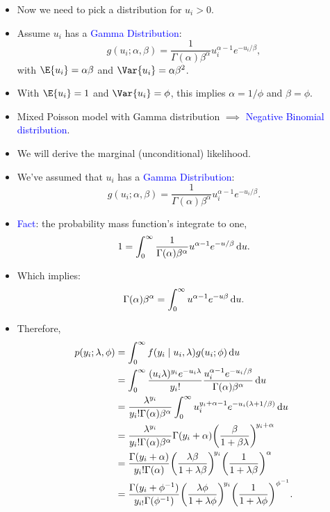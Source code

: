 \documentclass[oneside]{book}\usepackage[]{graphicx}\usepackage[svgnames]{xcolor}
\begin{document}
\begin{itemize}
    \item Now we need to pick a distribution for $ u_i>0 $.
    \item Assume $ u_i $ has a \textcolor{Blue}{Gamma Distribution}:
          \[ g(u_i;\alpha,\beta)=\frac{1}{\Gamma(\alpha)\beta^\alpha}u_i^{\alpha-1}e^{-u_i/\beta}, \]
          with $ \E{u_i}=\alpha\beta $ and $ \Var{u_i}=\alpha\beta^2 $.
    \item With $ \E{u_i}=1 $ and $ \Var{u_i}=\phi $, this implies $ \alpha=1/\phi $ and $ \beta=\phi $.
    \item Mixed Poisson model with Gamma distribution $ \implies $ \textcolor{Blue}{Negative Binomial distribution}.
    \item We will derive the marginal (unconditional) likelihood.
    \item We've assumed that $ u_i $ has a \textcolor{Blue}{Gamma Distribution}:
          \[ g(u_i;\alpha,\beta)=\frac{1}{\Gamma(\alpha)\beta^\alpha}u_i^{\alpha-1}e^{-u_i/\beta}. \]
    \item \textcolor{Blue}{Fact}: the probability mass function's integrate to one,
          \[ 1=\int_{0}^{\infty}\frac{1}{\Gamma(\alpha)\beta^\alpha}u^{\alpha-1}e^{-u/\beta}\odif{u}. \]
    \item Which implies:
          \[ \Gamma(\alpha)\beta^\alpha=\int_{0}^{\infty}u^{\alpha-1}e^{-u\beta}\odif{u}. \]
    \item Therefore,
          \begin{align*}
              p(y_i;\lambda,\phi)
               & =\int_{0}^{\infty} f(y_i\mid u_i,\lambda) g(u_i; \phi) \odif{u}                                                                                                       \\
               & =\int_{0}^{\infty} \frac{(u_i \lambda)^{y_i} e^{-u_i \lambda}}{y_i!}\frac{u_i^{\alpha-1} e^{-u_i / \beta}}{\Gamma(\alpha) \beta^{\alpha}} \odif{u}                    \\
               & =\frac{\lambda^{y_i}}{y_i ! \Gamma(\alpha) \beta^{\alpha}} \int_{0}^{\infty} u_i^{y_i+\alpha-1} e^{-u_i(\lambda+1 / \beta)} \odif{u}                                  \\
               & =\frac{\lambda^{y_i}}{y_i ! \Gamma(\alpha) \beta^{\alpha}} \Gamma(y_i+\alpha)\biggl(\frac{\beta}{1+\beta \lambda}\biggr)^{\! y_i+\alpha}                              \\
               & =\frac{\Gamma(y_i+\alpha)}{y_i ! \Gamma(\alpha)}\biggl(\frac{\lambda \beta}{1+\lambda \beta}\biggr)^{\!y_i}\biggl(\frac{1}{1+\lambda \beta}\biggr)^{\alpha}           \\
               & =\frac{\Gamma(y_i+\phi^{-1})}{y_{i !} \Gamma(\phi^{-1})}\biggl(\frac{\lambda \phi}{1+\lambda \phi}\biggr)^{\! y_i}\biggl(\frac{1}{1+\lambda \phi}\biggr)^{\phi^{-1}}.
          \end{align*}
\end{itemize}
\end{document}
